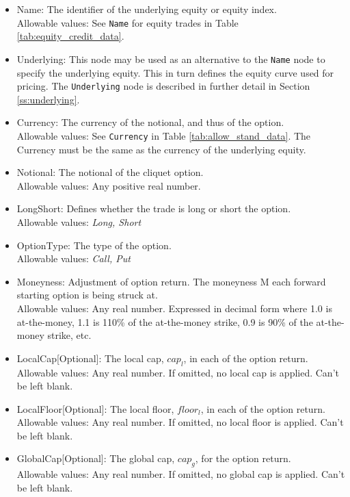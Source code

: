 \begin{itemize}
	\item Name: The identifier of the underlying equity or equity index. \\
	Allowable values: See \lstinline!Name! for equity trades in Table \ref{tab:equity_credit_data}.	
	\item Underlying:  This node may be used as an alternative to the \lstinline!Name! node to specify the underlying equity. This in turn defines the equity 		curve used for pricing. The \lstinline!Underlying! node is described in further detail in Section \ref{ss:underlying}. \\
	\item Currency: The currency of the notional, and thus of the option.  \\
	Allowable values: See \lstinline!Currency! in Table \ref{tab:allow_stand_data}. The Currency must be the same as the currency of the underlying equity.
	\item Notional: The notional of the cliquet option.\\
	Allowable values: Any positive real number.
	\item LongShort: Defines whether the trade is long or short the option. \\
	Allowable values: \emph{Long, Short}
	\item OptionType: The type of the option. \\
	Allowable values: \emph{Call, Put}
	\item Moneyness: Adjustment of option return. The moneyness M each forward starting option is being struck at.\\
	Allowable values: Any real number. Expressed in decimal form where 1.0 is at-the-money, 1.1 is 110\% of the at-the-money strike, 0.9  is 90\% of the at-the-money strike, etc.
	\item LocalCap[Optional]: The local cap, $cap_{l}$, in each of the option return. \\
	Allowable values: Any real number. If omitted, no local cap is applied. Can't be left blank.
	\item LocalFloor[Optional]: The local floor, $floor_{l}$, in each of the option return. \\
	Allowable values: Any real number. If omitted, no local floor is applied.  Can't be left blank.
	\item GlobalCap[Optional]: The global cap, $cap_{g}$, for the option return. \\
	Allowable values: Any real number. If omitted, no global cap is applied.  Can't be left blank.

\end{itemize}
